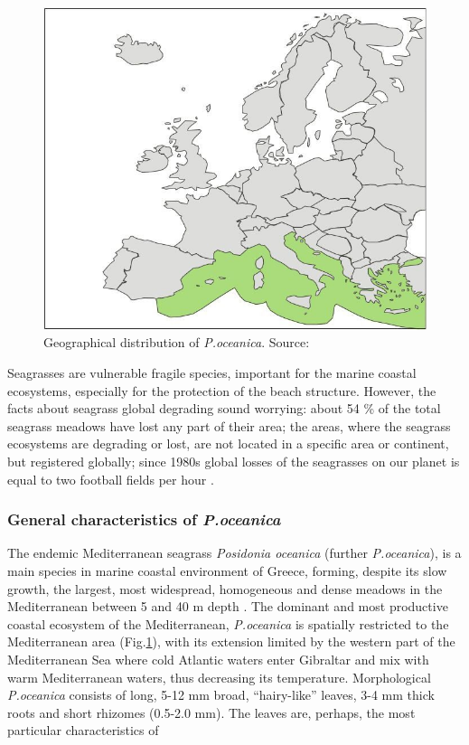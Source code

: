 \documentclass[10pt, a4paper]{article}
\begin{document}
\begin{figure}
	\centering
	\includegraphics[scale=0.20]{Fig-1-5.jpg}
	\caption{Geographical distribution of
	\textit{P.oceanica}. Source: \cite{Borum04}\label{Borum04}}
	\label{fig:5}
\end{figure}

Seagrasses are vulnerable fragile species, important for the marine coastal ecosystems, especially for
the protection of the beach structure. However, the facts about seagrass global degrading sound
worrying: about 54 \% of the total seagrass meadows have lost any part of their area; the areas, where
the seagrass ecosystems are degrading or lost, are not located in a specific area or continent, but
registered globally; since 1980s global losses of the seagrasses on our planet is equal to two football
fields per hour \cite{Mellors09b}\label{Mellors09b}.

\subsubsection{General characteristics of \textit{P.oceanica}}
The endemic Mediterranean seagrass \textit{Posidonia oceanica} (further \textit{P.oceanica}), is a main species in
marine coastal environment of Greece, forming, despite its slow growth, the largest, most widespread,
homogeneous and dense meadows in the Mediterranean between 5 and 40 m depth \cite{DenHartog70}\label{DenHartog70}.
The dominant and most productive coastal ecosystem of the Mediterranean, \textit{P.oceanica} is
spatially restricted to the Mediterranean area (Fig.\ref{fig:5}), with its extension limited by the western part
of the Mediterranean Sea where cold Atlantic waters enter Gibraltar and mix with warm
Mediterranean waters, thus decreasing its temperature.
Morphological \textit{P.oceanica} consists of long, 5-12 mm broad, “hairy-like” leaves, 3-4 mm thick roots
and short rhizomes (0.5-2.0 mm). The leaves are, perhaps, the most particular characteristics of
\end{document}
